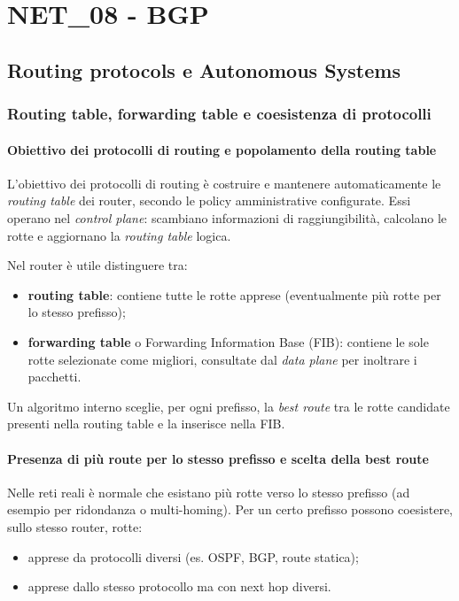 \section{NET\_08 - BGP}


\subsection{Routing protocols e Autonomous Systems}

\subsubsection{Routing table, forwarding table e coesistenza di protocolli}

\paragraph{Obiettivo dei protocolli di routing e popolamento della routing table}

L’obiettivo dei protocolli di routing è costruire e mantenere automaticamente le \emph{routing table} dei router, secondo le policy amministrative configurate. Essi operano nel \emph{control plane}: scambiano informazioni di raggiungibilità, calcolano le rotte e aggiornano la \emph{routing table} logica.

Nel router è utile distinguere tra:
\begin{itemize}
    \item \textbf{routing table}: contiene tutte le rotte apprese (eventualmente più rotte per lo stesso prefisso);
    \item \textbf{forwarding table} o Forwarding Information Base (FIB): contiene le sole rotte selezionate come migliori, consultate dal \emph{data plane} per inoltrare i pacchetti.
\end{itemize}

Un algoritmo interno sceglie, per ogni prefisso, la \emph{best route} tra le rotte candidate presenti nella routing table e la inserisce nella FIB.

\paragraph{Presenza di più route per lo stesso prefisso e scelta della best route}

Nelle reti reali è normale che esistano più rotte verso lo stesso prefisso (ad esempio per ridondanza o multi-homing). Per un certo prefisso possono coesistere, sullo stesso router, rotte:
\begin{itemize}
    \item apprese da protocolli diversi (es. OSPF, BGP, route statica);
    \item apprese dallo stesso protocollo ma con next hop diversi.
\end{itemize}

